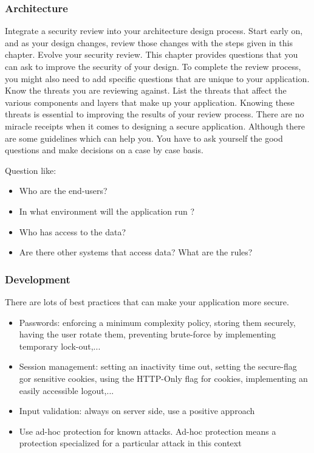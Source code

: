 \subsubsection{Architecture}
Integrate a security review into your architecture design process. Start
early on, and as your design changes, review those changes with the
steps given in this chapter.
Evolve your security review. This chapter provides questions that you
can ask to improve the security of your design. To complete the review
process, you might also need to add specific questions that are unique
to your application.
Know the threats you are reviewing against. List the threats that affect the various components and layers that make up your application. 
Knowing these threats is essential to improving the results of your review process.
There are no miracle receipts when it comes to designing a secure
application. Although there are some guidelines which can help you. You
have to ask yourself the good questions and make decisions on a case by
case basis.

Question like:
\begin{itemize}
\item Who are the end-users?
\item In what environment will the application run ? 
\item Who has access to the data? 
\item Are there other systems that access data? What are the rules?
\end{itemize}

\subsubsection{Development}
There are lots of best practices that can make your application more secure. 
\begin{itemize}
\item Passwords: enforcing a minimum complexity policy, storing them securely, having the user rotate them, preventing brute-force by implementing temporary lock-out,...
\item Session management: setting an inactivity time out, setting the secure-flag gor sensitive cookies, using the HTTP-Only flag for cookies, implementing an easily accessible logout,...
\item Input validation: always on server side, use a positive approach
\item Use ad-hoc protection for known attacks. Ad-hoc protection means a protection specialized for a particular attack in this context
\end{itemize}

